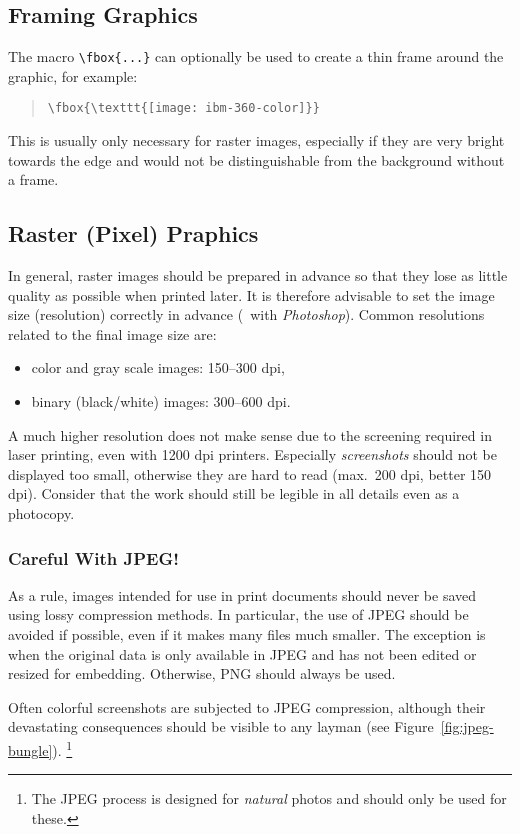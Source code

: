 \subsection{Framing Graphics}

The macro \verb!\fbox{...}! can optionally be used to create a thin frame
around the graphic, for example:
%
\begin{quote}
    \verb!\fbox{\texttt{[image: ibm-360-color]}}!
\end{quote}
%
This is usually only necessary for raster images, especially if they are very
bright towards the edge and would not be distinguishable from the background
without a frame.

\subsection{Raster (Pixel) Praphics}

In general, raster images should be prepared in advance so that they lose as
little quality as possible when printed later. It is therefore advisable to
set the image size (resolution) correctly in advance (\eg\ with
\emph{Photoshop}). Common resolutions related to the final image size are:
%
\begin{itemize}
    \item color and gray scale images: 150--300 dpi,
    \item binary (black/white) images: 300--600 dpi.
\end{itemize}
%
A much higher resolution does not make sense due to the screening required in
laser printing, even with 1200 dpi printers. Especially \emph{screen\-shots}
should not be displayed too small, otherwise they are hard to read (max.\ 200
dpi, better 150 dpi). Consider that the work should still be legible in all
details even as a photocopy.

\subsubsection{Careful With JPEG!}

As a rule, images intended for use in print documents should never be saved
using lossy compression methods. In particular, the use of JPEG should be
avoided if possible, even if it makes many files much smaller. The exception
is when the original data is only available in JPEG and has not been edited
or resized for embedding. Otherwise, PNG should always be used.

Often colorful screenshots are subjected to JPEG compression, although their
devastating consequences should be visible to any layman (see
Figure~\ref{fig:jpeg-bungle}).%
\footnote{The JPEG process is designed for \emph{natural} photos and should
only be used for these.}

